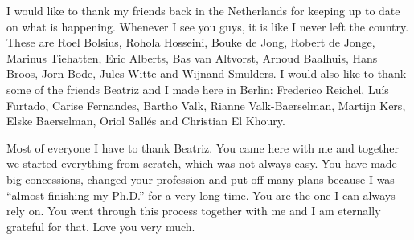 I would like to thank my friends back in the Netherlands for keeping up to date on what is happening. Whenever I see you guys, it is like I never left the country. These are Roel Bolsius, Rohola Hosseini, Bouke de Jong, Robert de Jonge, Marinus Tiehatten, Eric Alberts, Bas van Altvorst, Arnoud Baalhuis, Hans Broos, Jorn Bode, Jules Witte and Wijnand Smulders. I would also like to thank some of the friends Beatriz and I made here in Berlin: Frederico Reichel, Luís Furtado, Carise Fernandes, Bartho Valk, Rianne Valk-Baerselman, Martijn Kers, Elske Baerselman, Oriol Sallés and Christian El Khoury.

Most of everyone I have to thank Beatriz. You came here with me and together we started everything from scratch, which was not always easy. You have made big concessions, changed your profession and put off many plans because I was ``almost finishing my Ph.D.'' for a very long time. You are the one I can always rely on. You went through this process together with me and I am eternally grateful for that. Love you very much.
